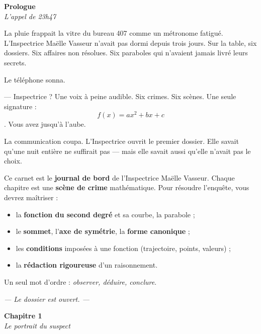 \documentclass[11pt,a4paper]{article}
\newcommand{\chapterheader}[2]{%
  \clearpage
  \begin{tcolorbox}[
    enhanced,
    colback=ink, colframe=ink,
    interior style={top color=ink, bottom color=charcoal, shading angle=90},
    boxrule=0pt, arc=0pt,
    left=18pt, right=18pt, top=14pt, bottom=14pt,
    width=\textwidth,
  ]
    {\color{white}\Huge\bfseries #1}\\[6pt]
    {\color{silver}\large\itshape #2}
  \end{tcolorbox}
  \vspace{6pt}
}
\begin{document}
\clearpage
\renewcommand{\contentsname}{\textcolor{ink}{Table des affaires}}
\tableofcontents
\thispagestyle{empty}

\chapterheader{Prologue}{L'appel de 23h47}

La pluie frappait la vitre du bureau 407 comme un métronome fatigué. L'Inspectrice Maëlle Vasseur n'avait pas dormi depuis trois jours. Sur la table, six dossiers. Six affaires non résolues. Six paraboles qui n'avaient jamais livré leurs secrets.

Le téléphone sonna.

— Inspectrice ? Une voix à peine audible. Six crimes. Six scènes. Une seule signature : $$f(x) = ax^2 + bx + c$$. Vous avez jusqu'à l'aube.

La communication coupa. L'Inspectrice ouvrit le premier dossier. Elle savait qu'une nuit entière ne suffirait pas — mais elle savait aussi qu'elle n'avait pas le choix.

\begin{indice}
Ce carnet est le \textbf{journal de bord} de l'Inspectrice Maëlle Vasseur. Chaque chapitre est une \textbf{scène de crime} mathématique. Pour résoudre l'enquête, vous devrez maîtriser :
\begin{itemize}[leftmargin=*]
  \item la \textbf{fonction du second degré} et sa courbe, la parabole ;
  \item le \textbf{sommet}, l'\textbf{axe de symétrie}, la \textbf{forme canonique} ;
  \item les \textbf{conditions} imposées à une fonction (trajectoire, points, valeurs) ;
  \item la \textbf{rédaction rigoureuse} d'un raisonnement.
\end{itemize}
Un seul mot d'ordre : \emph{observer, déduire, conclure}.
\end{indice}

\vfill
\begin{center}
\textcolor{slate}{\itshape\small — Le dossier est ouvert. —}
\end{center}

\chapterheader{Chapitre 1}{Le portrait du suspect}
\end{document}
